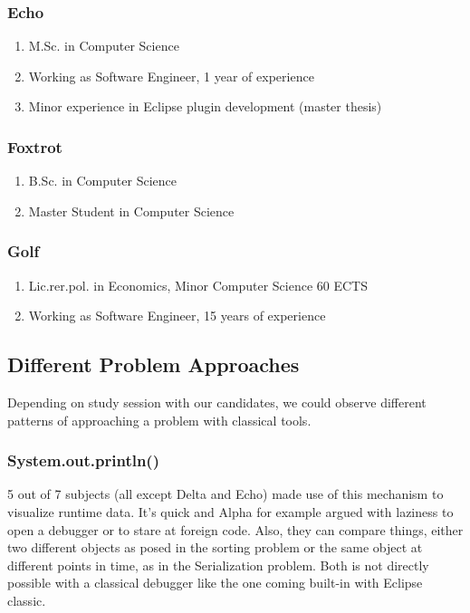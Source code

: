 \documentclass[english]{acm_proc_article-sp}
\begin{document}
\subsubsection{Echo} %
\begin{enumerate}[$-$]
\item M.Sc. in Computer Science
\item Working as Software Engineer, 1 year of experience
\item Minor experience in Eclipse plugin development (master thesis)
\end{enumerate}

\subsubsection{Foxtrot} %
\begin{enumerate}[$-$]
\item B.Sc. in Computer Science
\item Master Student  in Computer Science
\end{enumerate}

\subsubsection{Golf} %
\begin{enumerate}[$-$]
\item Lic.rer.pol. in Economics, Minor Computer Science 60 ECTS
\item Working as Software Engineer, 15 years of experience
\end{enumerate}

\subsection{Different Problem Approaches}
Depending on study session with our candidates, we could observe different patterns of approaching a problem with classical tools.
\subsubsection{System.out.println()}
5 out of 7 subjects (all except Delta and Echo) made use of this mechanism to visualize runtime data. It's quick and Alpha for example argued with laziness to open a debugger or to stare at foreign code. Also, they can compare things, either two different objects as posed in the sorting problem or the same object at different points in time, as in the Serialization problem. Both is not directly possible with a classical debugger like the one coming built-in with Eclipse classic.
\end{document}

